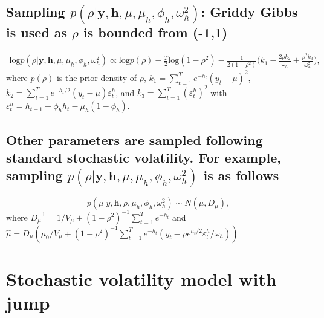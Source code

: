 \documentclass[11pt]{article}
\newcommand{\bbeq}{\begin{equation*}}
\newcommand{\eeeq}{\end{equation*}}
\numberwithin{equation}{section}
\begin{document}
\subsection*{Sampling $p(\rho|\mathbf{y}, \mathbf{h}, \mu, \mu_h, \phi_h, \omega^2_h)$: Griddy Gibbs is used  as $\rho$ is bounded from (-1,1)}

\begin{align*}
\text{log}p(\rho|\mathbf{y}, \mathbf{h}, \mu, \mu_h, \phi_h, \omega^2_h) \propto \text{log}p(\rho) -\frac{T}{2} \text{log}(1-\rho^2) -\frac{1}{2(1-\rho^2)} \Big(k_1 -\frac{2\rho k_2}{\omega_h}+\frac{\rho^2k_3}{\omega^2_h} \Big),
\end{align*}
where $p(\rho)$ is the prior density of $\rho$, $k_1=\sum_{t=1}^T e^{-h_t}(y_t -\mu)^2$, $k_2 =\sum_{t=1}^T e^{-h_t/2}(y_t-\mu) \varepsilon_t^h$, and $k_3=\sum_{t=1}^T(\varepsilon^h_t)^2$ with $\varepsilon_t^h=h_{t+1}-\phi_hh_t -\mu_h(1-\phi_h)$. 
\subsection*{Other parameters are sampled following standard stochastic volatility. For example, sampling $p(\rho|\mathbf{y}, \mathbf{h}, \mu, \mu_h, \phi_h, \omega^2_h)$ is as follows}
\bbeq
p(\mu|y, \mathbf{h}, \rho, \mu_h, \phi_h, \omega^2_h) \sim N(\hat{\mu}, D_{\mu}),
\eeeq
where $D^{-1}_{\mu}= 1/V_{\mu} +(1-\rho^2)^{-1} \sum_{t=1}^T e^{-h_t}$ and $\hat{\mu}=D_{\mu}(\mu_0/V_{\mu}+(1-\rho^2)^{-1} \sum_{t=1}^T e^{-h_t}(y_t-\rho e^{h_t/2}\varepsilon_t^h/\omega_h))$


\section{Stochastic volatility model with jump }



 
\end{document}
